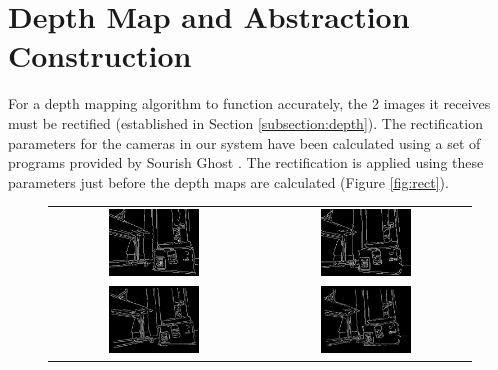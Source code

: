 \section{Depth Map and Abstraction Construction}
\label{section:depth}

For a depth mapping algorithm to function accurately, the 2 images it receives must be rectified (established in Section \ref{subsection:depth}). The rectification parameters for the cameras in our system have been calculated using a set of programs provided by Sourish Ghost \cite{calibgit}. The rectification is applied using these parameters just before the depth maps are calculated (Figure \ref{fig:rect}).

\begin{figure}[H]
    \begin{center}
    \begin{tabular}{ c c }
        \includegraphics[width=0.45\textwidth]{Figures/prerectL.jpg} &
        \includegraphics[width=0.45\textwidth]{Figures/prerectR.jpg} \\
        \includegraphics[width=0.45\textwidth]{Figures/postrectL.jpg} &
        \includegraphics[width=0.45\textwidth]{Figures/postrectR.jpg}

\end{tabular}
\end{center}
\end{figure}

